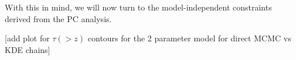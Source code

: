 \documentclass[prd,twocolumn,amsmath,amssymb,floatfix,superscriptaddress,nofootinbib]{revtex4-1}
\newcommand{\reffig}[1]{Fig.~\ref{fig:#1}}
\newcommand{\zmax}{z_{\rm max}}
\newcommand{\tauhi}{\tau_{\rm hi}}
\newcommand{\taulo}{\tau_{\rm lo}}
\newcommand{\ch}[1]{\textcolor{red}{#1}}
\begin{document}
With this in mind, we will now turn to the model-independent constraints derived from the PC analysis.


[add plot for $\tau(>z)$ contours for the 2 parameter model for direct MCMC vs KDE chains]





\end{document}
